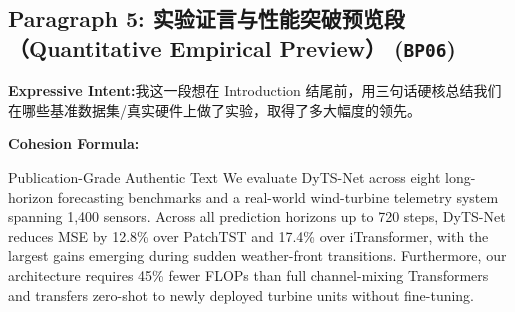 \subsection*{Paragraph 5: 实验证言与性能突破预览段（Quantitative Empirical Preview） (\texttt{BP06})}
\noindent\textbf{Expressive Intent:}\enspace 我这一段想在 Introduction 结尾前，用三句话硬核总结我们在哪些基准数据集/真实硬件上做了实验，取得了多大幅度的领先。\par
\noindent\textbf{Cohesion Formula:}\par\vspace{4pt}
\begin{ExampleBox}{Publication-Grade Authentic Text}
We evaluate DyTS-Net across eight long-horizon forecasting benchmarks and a real-world wind-turbine telemetry system spanning 1,400 sensors. Across all prediction horizons up to 720 steps, DyTS-Net reduces MSE by 12.8\% over PatchTST and 17.4\% over iTransformer, with the largest gains emerging during sudden weather-front transitions. Furthermore, our architecture requires 45\% fewer FLOPs than full channel-mixing Transformers and transfers zero-shot to newly deployed turbine units without fine-tuning.
\end{ExampleBox}
